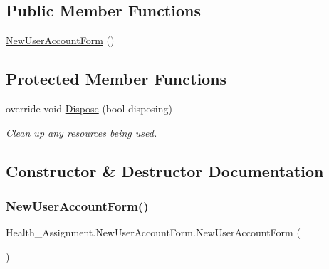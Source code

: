 \subsection*{Public Member Functions}
\begin{DoxyCompactItemize}
\item 
\hyperlink{class_health___assignment_1_1_new_user_account_form_a87e9acec33b43f00d735fcb386ca084f}{New\+User\+Account\+Form} ()
\end{DoxyCompactItemize}
\subsection*{Protected Member Functions}
\begin{DoxyCompactItemize}
\item 
override void \hyperlink{class_health___assignment_1_1_new_user_account_form_a0e75f26c896eb8b06255a75fb8007bb5}{Dispose} (bool disposing)
\begin{DoxyCompactList}\small\item\em Clean up any resources being used. \end{DoxyCompactList}\end{DoxyCompactItemize}


\subsection{Constructor \& Destructor Documentation}
\mbox{\label{class_health___assignment_1_1_new_user_account_form_a87e9acec33b43f00d735fcb386ca084f}} 
\subsubsection{\texorpdfstring{New\+User\+Account\+Form()}{NewUserAccountForm()}}
{\footnotesize\ttfamily Health\+\_\+\+Assignment.\+New\+User\+Account\+Form.\+New\+User\+Account\+Form (\begin{DoxyParamCaption}{ }\end{DoxyParamCaption})\hspace{0.3cm}{\ttfamily [inline]}}



